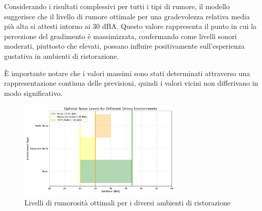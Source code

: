 Considerando i risultati complessivi per tutti i tipi di rumore, il modello suggerisce che il livello di rumore ottimale per una gradevolezza relativa media più alta si attesti intorno ai 30 dBA. Questo valore rappresenta il punto in cui la percezione del gradimento è massimizzata, confermando come livelli sonori moderati, piuttosto che elevati, possano influire positivamente sull'esperienza gustativa in ambienti di ristorazione.

È importante notare che i valori massimi sono stati determinati attraverso una rappresentazione continua delle previsioni, quindi i valori vicini non differivano in modo significativo.

\begin{figure}[H]
      \centering
      \includegraphics[width=0.7\textwidth]{Chapters/Figures/optimal_noise_levels_improved.pdf} %
      \caption{\small Livelli di rumorosità ottimali per i diversi ambienti di ristorazione}
      \label{fig:graph_label}
\end{figure}

